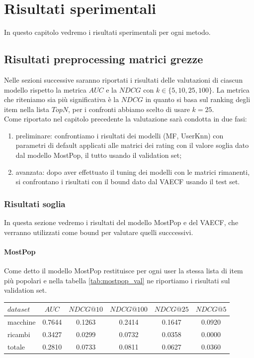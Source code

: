 \hypertarget{(chap:capitolo6)}{}
\chapter{Risultati sperimentali}
In questo capitolo vedremo i risultati sperimentali per ogni metodo.
\section{Risultati preprocessing matrici grezze}
Nelle sezioni successive saranno riportati i risultati delle valutazioni di ciascun modello rispetto la metrica $AUC$ e la $NDCG$ con $k\in \{5, 10, 25, 100\}$.
La metrica che riteniamo sia più significativa è la $NDCG$ in quanto si basa sul ranking degli item nella lista $TopN$, per i confronti abbiamo scelto di usare $k=25$.\\
Come riportato nel capitolo precedente la valutazione sarà condotta in due fasi: 
\begin{enumerate}
    \item preliminare: confrontiamo i risultati dei modelli (MF, UserKnn) con parametri di default applicati alle matrici dei rating con il valore soglia dato dal modello MostPop, il tutto usando il validation set;
    \item avanzata: dopo aver effettuato il tuning dei modelli con le matrici rimanenti, si confrontano i risultati con il bound dato dal VAECF usando il test set.
\end{enumerate} 

\subsection{Risultati soglia}
In questa sezione vedremo i risultati del modello MostPop e del VAECF, che verranno utilizzati come bound per valutare quelli succcessivi. 

\subsubsection{MostPop}
Come detto il modello MostPop restituisce per ogni user la stessa lista di item più popolari e nella tabella \ref{tab:mostpop_val} ne riportiamo i risultati sul validation set.
\begin{center}
\begin{tabular}{|l|c|cccc|}
    \toprule
    $dataset$ &    $AUC$ &  $NDCG@10$ & $NDCG@100$  & $NDCG@25$ & $NDCG@5$  \\
    \midrule
    macchine & 0.7644 & 0.1263 &   0.2414 &  0.1647 & 0.0920 \\
    ricambi  & 0.3427 &  0.0299 &   0.0732 &  0.0358 & 0.0000 \\
    totale  & 0.2810 &  0.0733 &   0.0811 &  0.0627 & 0.0360 \\

\bottomrule
\end{tabular}
\label{tab:mostpop_val}
\end{center} 

